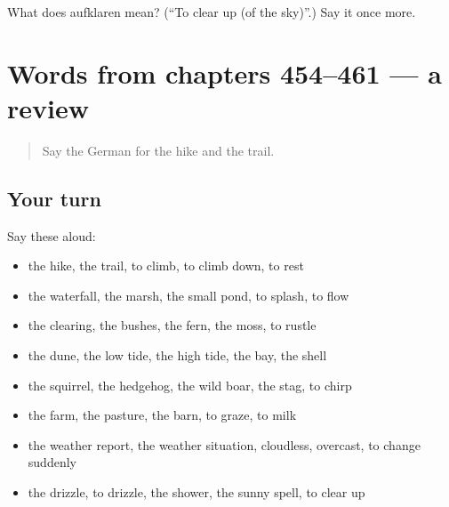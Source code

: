 \begin{tcolorbox}[breakable,colback=teal!4,colframe=teal!35!black,title={Before you move on}]
What does aufklaren mean? (\textquotedblleft{}To clear up (of the sky)\textquotedblright{}.) Say it once more.
\end{tcolorbox}
\section[(dialogue)]{Words from chapters 454–461 — a review}

\label{lesson:GE-R461-review-454-461}



\begin{quote}
Say the German for the hike and the trail.
\end{quote}

\subsection*{Your turn}
Say these aloud:

\begin{itemize}
\raggedright
  \item the hike, the trail, to climb, to climb down, to rest
  \item the waterfall, the marsh, the small pond, to splash, to flow
  \item the clearing, the bushes, the fern, the moss, to rustle
  \item the dune, the low tide, the high tide, the bay, the shell
  \item the squirrel, the hedgehog, the wild boar, the stag, to chirp
  \item the farm, the pasture, the barn, to graze, to milk
  \item the weather report, the weather situation, cloudless, overcast, to change suddenly
  \item the drizzle, to drizzle, the shower, the sunny spell, to clear up
\end{itemize}

